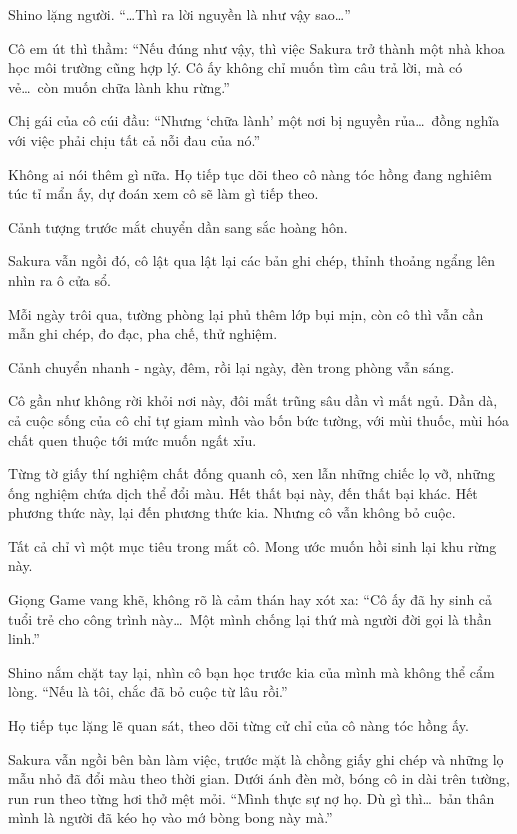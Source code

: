 \documentclass[../main.tex]{subfiles}
\begin{document}
Shino lặng người. ``\dots Thì ra lời nguyền là như vậy sao\dots''

Cô em út thì thầm: ``Nếu đúng như vậy, thì việc Sakura trở thành một nhà khoa học môi trường cũng hợp lý. Cô ấy không chỉ muốn tìm câu trả lời, mà có vẻ\dots\ còn muốn chữa lành khu rừng.''

Chị gái của cô cúi đầu: ``Nhưng `chữa lành' một nơi bị nguyền rủa\dots\ đồng nghĩa với việc phải chịu tất cả nỗi đau của nó.''

Không ai nói thêm gì nữa. Họ tiếp tục dõi theo cô nàng tóc hồng đang nghiêm túc tỉ mẩn ấy, dự đoán xem cô sẽ làm gì tiếp theo.

Cảnh tượng trước mắt chuyển dần sang sắc hoàng hôn.

Sakura vẫn ngồi đó, cô lật qua lật lại các bản ghi chép, thỉnh thoảng ngẩng lên nhìn ra ô cửa sổ.

Mỗi ngày trôi qua, tường phòng lại phủ thêm lớp bụi mịn, còn cô thì vẫn cần mẫn ghi chép, đo đạc, pha chế, thử nghiệm.

Cảnh chuyển nhanh - ngày, đêm, rồi lại ngày, đèn trong phòng vẫn sáng.

Cô gần như không rời khỏi nơi này, đôi mắt trũng sâu dần vì mất ngủ. Dần dà, cả cuộc sống của cô chỉ tự giam mình vào bốn bức tường, với mùi thuốc, mùi hóa chất quen thuộc tới mức muốn ngất xỉu.

Từng tờ giấy thí nghiệm chất đống quanh cô, xen lẫn những chiếc lọ vỡ, những ống nghiệm chứa dịch thể đổi màu. Hết thất bại này, đến thất bại khác. Hết phương thức này, lại đến phương thức kia. Nhưng cô vẫn không bỏ cuộc.

Tất cả chỉ vì một mục tiêu trong mắt cô. Mong ước muốn hồi sinh lại khu rừng này.

Giọng Game vang khẽ, không rõ là cảm thán hay xót xa: ``Cô ấy đã hy sinh cả tuổi trẻ cho công trình này\dots\ Một mình chống lại thứ mà người đời gọi là thần linh.''

Shino nắm chặt tay lại, nhìn cô bạn học trước kia của mình mà không thể cẩm lòng. ``Nếu là tôi, chắc đã bỏ cuộc từ lâu rồi.''

Họ tiếp tục lặng lẽ quan sát, theo dõi từng cử chỉ của cô nàng tóc hồng ấy.

Sakura vẫn ngồi bên bàn làm việc, trước mặt là chồng giấy ghi chép và những lọ mẫu nhỏ đã đổi màu theo thời gian. Dưới ánh đèn mờ, bóng cô in dài trên tường, run run theo từng hơi thở mệt mỏi. ``Mình thực sự nợ họ. Dù gì thì\dots\ bản thân mình là người đã kéo họ vào mớ bòng bong này mà.''
\end{document}
